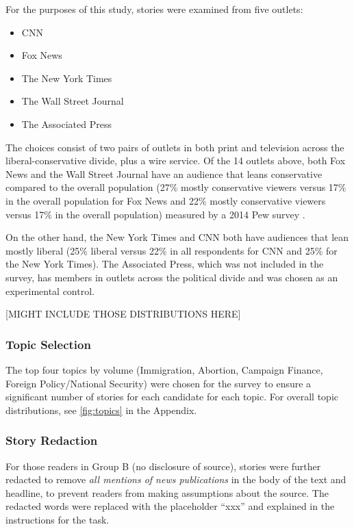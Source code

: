     For the purposes of this study, stories were examined from five outlets: 

    \begin{itemize}
    \itemsep-1em 
      \item CNN
      \item Fox News  
      \item The New York Times
      \item The Wall Street Journal 
      \item The Associated Press 
    \end{itemize}

    The choices consist of two pairs of outlets in both print and television across the liberal-conservative divide, plus a wire service. Of the 14 outlets above, both Fox News and the Wall Street Journal have an audience that leans conservative compared to the overall population (27\% mostly conservative viewers versus 17\% in the overall population for Fox News and 22\% mostly conservative viewers versus 17\% in the overall population) measured by a 2014 Pew survey \cite{PoliticalPolarization}.

    On the other hand, the New York Times and CNN both have audiences that lean mostly liberal (25\% liberal versus 22\% in all respondents for CNN and 25\% for the New York Times). The Associated Press, which was not included in the survey, has members in outlets across the political divide and was chosen as an experimental control. 

    [MIGHT INCLUDE THOSE DISTRIBUTIONS HERE]

    \subsubsection{Topic Selection}

    The top four topics by volume (Immigration, Abortion, Campaign Finance, Foreign Policy/National Security) were chosen for the survey to ensure a significant number of stories for each candidate for each topic. For overall topic distributions, see \ref{fig:topics} in the Appendix.
     

    \subsubsection{Story Redaction}
    For those readers in Group B (no disclosure of source), stories were further redacted to remove \emph{all mentions of news publications} in the body of the text and headline, to prevent readers from making assumptions about the source. The redacted words were replaced with the placeholder ``xxx'' and explained in the instructions for the task.


